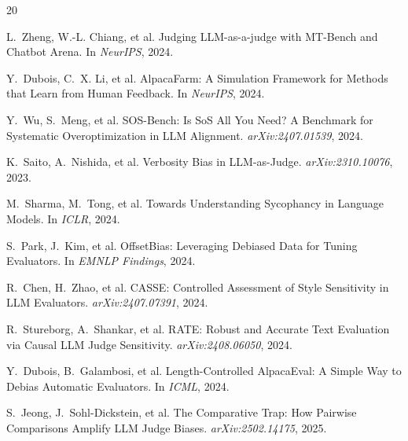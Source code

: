\documentclass[11pt,twocolumn]{article}
\begin{document}

\begin{thebibliography}{20}

L.~Zheng, W.-L. Chiang, et al.
\newblock Judging LLM-as-a-judge with MT-Bench and Chatbot Arena.
\newblock In \emph{NeurIPS}, 2024.

Y.~Dubois, C.~X. Li, et al.
\newblock AlpacaFarm: A Simulation Framework for Methods that Learn from Human Feedback.
\newblock In \emph{NeurIPS}, 2024.

Y.~Wu, S.~Meng, et al.
\newblock SOS-Bench: Is SoS All You Need? A Benchmark for Systematic Overoptimization in LLM Alignment.
\newblock \emph{arXiv:2407.01539}, 2024.

K.~Saito, A.~Nishida, et al.
\newblock Verbosity Bias in LLM-as-Judge.
\newblock \emph{arXiv:2310.10076}, 2023.

M.~Sharma, M.~Tong, et al.
\newblock Towards Understanding Sycophancy in Language Models.
\newblock In \emph{ICLR}, 2024.

S.~Park, J.~Kim, et al.
\newblock OffsetBias: Leveraging Debiased Data for Tuning Evaluators.
\newblock In \emph{EMNLP Findings}, 2024.

R.~Chen, H.~Zhao, et al.
\newblock CASSE: Controlled Assessment of Style Sensitivity in LLM Evaluators.
\newblock \emph{arXiv:2407.07391}, 2024.

R.~Stureborg, A.~Shankar, et al.
\newblock RATE: Robust and Accurate Text Evaluation via Causal LLM Judge Sensitivity.
\newblock \emph{arXiv:2408.06050}, 2024.

Y.~Dubois, B.~Galambosi, et al.
\newblock Length-Controlled AlpacaEval: A Simple Way to Debias Automatic Evaluators.
\newblock In \emph{ICML}, 2024.

S.~Jeong, J.~Sohl-Dickstein, et al.
\newblock The Comparative Trap: How Pairwise Comparisons Amplify LLM Judge Biases.
\newblock \emph{arXiv:2502.14175}, 2025.

\end{thebibliography}
\end{document}
